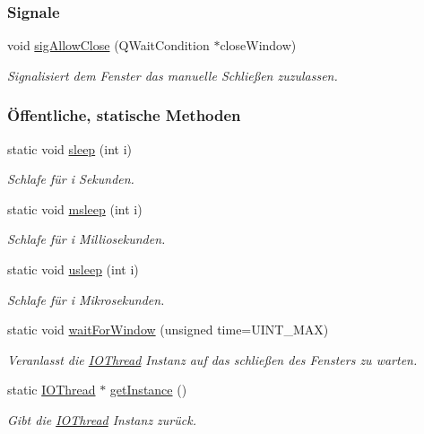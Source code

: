 \subsubsection*{Signale}
\begin{DoxyCompactItemize}
\item 
void \mbox{\hyperlink{classIOThread_a54c13ad95a4121f8350490f3498e3441}{sig\+Allow\+Close}} (Q\+Wait\+Condition $\ast$close\+Window)
\begin{DoxyCompactList}\small\item\em Signalisiert dem Fenster das manuelle Schließen zuzulassen. \end{DoxyCompactList}\end{DoxyCompactItemize}
\subsubsection*{Öffentliche, statische Methoden}
\begin{DoxyCompactItemize}
\item 
static void \mbox{\hyperlink{classIOThread_a223f34be4cb93bc966782c21d1f111be}{sleep}} (int i)
\begin{DoxyCompactList}\small\item\em Schlafe für {\ttfamily i} Sekunden. \end{DoxyCompactList}\item 
static void \mbox{\hyperlink{classIOThread_a0edafa7b86ce9da704411c957c67a7d2}{msleep}} (int i)
\begin{DoxyCompactList}\small\item\em Schlafe für {\ttfamily i} Milliosekunden. \end{DoxyCompactList}\item 
static void \mbox{\hyperlink{classIOThread_a48db366a9cdd047fa160726186955170}{usleep}} (int i)
\begin{DoxyCompactList}\small\item\em Schlafe für {\ttfamily i} Mikrosekunden. \end{DoxyCompactList}\item 
static void \mbox{\hyperlink{classIOThread_a0518abc93c6d77c2e085d431d2b8d42c}{wait\+For\+Window}} (unsigned time=U\+I\+N\+T\+\_\+\+M\+AX)
\begin{DoxyCompactList}\small\item\em Veranlasst die \mbox{\hyperlink{classIOThread}{I\+O\+Thread}} Instanz auf das schließen des Fensters zu warten. \end{DoxyCompactList}\item 
static \mbox{\hyperlink{classIOThread}{I\+O\+Thread}} $\ast$ \mbox{\hyperlink{classIOThread_a99c8f19b8b37cc58f0d7b7458de7631e}{get\+Instance}} ()
\begin{DoxyCompactList}\small\item\em Gibt die \mbox{\hyperlink{classIOThread}{I\+O\+Thread}} Instanz zurück. \end{DoxyCompactList}\end{DoxyCompactItemize}
